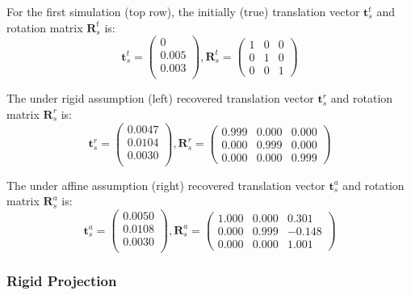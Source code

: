 \documentclass[11pt, a4paper, oneside, twocolumn]{report}
\renewcommand{\b}{\textbf}
\begin{document}
For the first simulation (top row), the initially (true) translation
vector $\b{t}_s^t$ and rotation matrix $\b{R}_s^t$ is:
\begin{equation}
  \b{t}_s^t=
  \begin{pmatrix}
    0 \\
    0.005 \\
    0.003 \\
  \end{pmatrix}
  ,  \b{R}_s^t=
  \begin{pmatrix}
    1 & 0 & 0 \\
    0 & 1 & 0 \\
    0 & 0 & 1
  \end{pmatrix}
\end{equation}

The under rigid assumption (left) recovered translation vector
$\b{t}_s^r$ and rotation matrix $\b{R}_s^r$ is:
\begin{equation}
  \b{t}_s^r=
  \begin{pmatrix}
    0.0047 \\
    0.0104 \\
    0.0030 \\
  \end{pmatrix}
  ,  \b{R}_s^r=
  \begin{pmatrix}
    0.999 & 0.000 & 0.000 \\
    0.000 & 0.999 & 0.000 \\
    0.000 & 0.000 & 0.999
  \end{pmatrix}
\end{equation}

The under affine assumption (right) recovered translation vector
$\b{t}_s^a$ and rotation matrix $\b{R}_s^a$ is:
\begin{equation}
  \b{t}_s^a=
  \begin{pmatrix}
    0.0050 \\
    0.0108 \\
    0.0030 \\
  \end{pmatrix}
  ,  \b{R}_s^a=
  \begin{pmatrix}
    1.000 & 0.000 & 0.301 \\
    0.000 & 0.999 & -0.148 \\
    0.000 & 0.000 & 1.001
  \end{pmatrix}
\end{equation}

\subsubsection{Rigid Projection}
\end{document}
